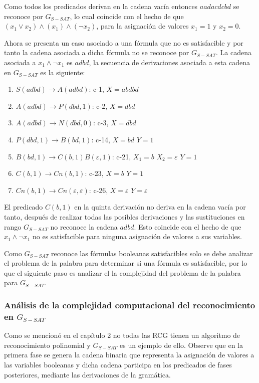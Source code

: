 Como todos los predicados derivan en la cadena vacía entonces $aadacdcbd$ se reconoce por $G_{S-SAT}$,
lo cual coincide con el hecho de que $(x_1 \vee x_2) \wedge (x_1) \wedge (\neg x_2)$, para la asignación
de valores $x_1=1$ y $x_2=0$.

Ahora se presenta un caso asociado a una fórmula que no es satisfacible y por tanto la cadena asociada
a dicha fórmula no se reconoce por $G_{S-SAT}$. La cadena asociada a $x_1 \wedge \neg x_1$ es $adbd$,
la secuencia de derivaciones asociada a esta cadena en $G_{S-SAT}$ es la siguiente:

\begin{enumerate}
    \item $S(adbd)\to A(adbd)$: c-1, $X=abdbd$
    \item $A(adbd)\to P(dbd,1)$: c-2, $X=dbd$
    \item $A(adbd)\to N(dbd,0)$: c-3, $X=dbd$
    \item $P(dbd,1) \to B(bd,1)$: c-14, $X=bd$ $Y=1$
    \item $B(bd,1)\to C(b,1) B(\varepsilon,1)$: c-21, $X_1=b$ $X_2=\varepsilon$ $Y=1$
    \item $C(b,1)\to Cn(b,1)$: c-23, $X=b$ $Y=1$
    \item $Cn(b,1)\to Cn(\varepsilon,\varepsilon)$: c-26, $X=\varepsilon$ $Y=\varepsilon$
\end{enumerate}

El predicado $C(b,1)$ en la quinta derivación no deriva en la cadena vacía por tanto, después de realizar
todas las posibles derivaciones y las sustituciones en rango $G_{S-SAT}$ no reconoce la cadena $adbd$.
Esto coincide con el hecho de que $x_1 \wedge \neg x_1$ no es satisfacible para ninguna asignación de
valores a sus variables.

Como $G_{S-SAT}$ reconoce las fórmulas booleanas satisfacibles solo se debe analizar el problema de la
palabra para determinar si una fórmula es satisfacible, por lo que el siguiente paso es analizar el la
complejidad del problema de la palabra para $G_{S-SAT}$.

\subsubsection{Análisis de la complejidad computacional del reconocimiento en $G_{S-SAT}$}

Como se mencionó en el capítulo 2 no todas las RCG tienen un algoritmo de reconocimiento polinomial y
$G_{S-SAT}$ es un ejemplo de ello. Observe que en la primera fase se genera la cadena binaria que representa
la asignación de valores a las variables booleanas y dicha cadena participa en los predicados de fases
posteriores, mediante las derivaciones de la gramática.

